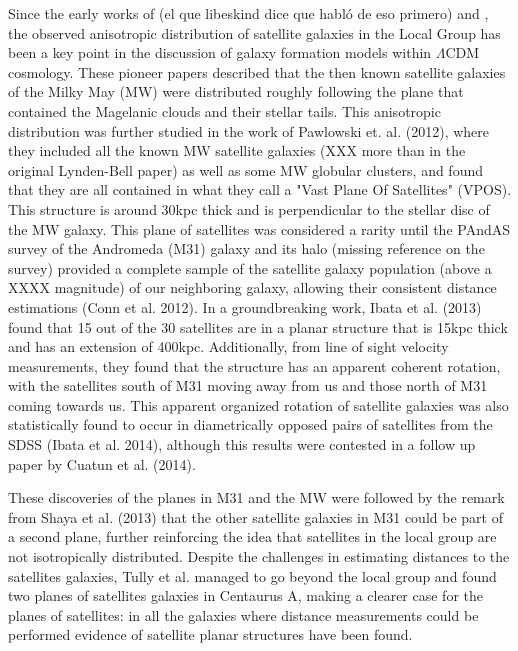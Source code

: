 \documentclass{emulateapj}
\begin{document}
\noindent Since the early works of (el que libeskind dice que habló de
eso primero) and \cite{1976MNRAS.174..695L}, the observed anisotropic
distribution of satellite galaxies in the Local Group has been a key
point in the discussion of galaxy formation models within $\Lambda$CDM
cosmology. These pioneer papers described that the then known satellite
galaxies of the Milky May (MW) were distributed roughly following the plane
that contained the Magelanic clouds and their stellar tails. This
anisotropic distribution was further studied in the work of \cite{}Pawlowski
et. al. (2012), where they included all the known MW satellite galaxies (XXX
more than in the original Lynden-Bell paper) as well as some MW globular
clusters, and found that they are all contained in what they call a
"Vast Plane Of Satellites" (VPOS). This structure is around 30kpc thick and
is perpendicular to the stellar disc of the MW galaxy. This plane of
satellites was considered a rarity until the PAndAS survey of the
Andromeda (M31) galaxy and its halo (missing reference on the survey)
provided a complete sample of the satellite galaxy population (above a
XXXX magnitude) of our neighboring galaxy, allowing their consistent distance
estimations (Conn et al. 2012). In a groundbreaking work, Ibata et
al. (2013) found that 15 out of the 30 satellites are in a planar
structure that is 15kpc thick and has an extension of 400kpc.
Additionally, from line of sight velocity measurements, they
found that the structure has an apparent coherent rotation, with the
satellites south of M31 moving away from us and those north of M31
coming towards us. This apparent organized rotation of satellite galaxies was also
statistically found to occur in diametrically opposed 
pairs of satellites from the SDSS (Ibata et al. 2014), although this
results were contested in a follow up paper by Cuatun et al. (2014).  

These discoveries of the planes in M31 and the MW were followed by the
remark from Shaya et al. (2013) that the other satellite galaxies in
M31 could be part of a second plane, further reinforcing the idea that
satellites in the local group are not isotropically distributed.
Despite the challenges in estimating distances to the satellites
galaxies, Tully et al. managed to go beyond the local group and found
two planes of satellites galaxies in Centaurus A, making a clearer
case for the planes of satellites: in all the galaxies where distance
measurements could be performed evidence of satellite planar
structures have been found.\\
\end{document}
